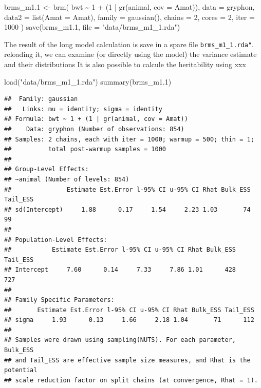 \documentclass[
  12pt,
]{book}
\newenvironment{Shaded}{\begin{snugshade}}{\end{snugshade}}
\newcommand{\AttributeTok}[1]{\textcolor[rgb]{0.77,0.63,0.00}{#1}}
\newcommand{\DecValTok}[1]{\textcolor[rgb]{0.00,0.00,0.81}{#1}}
\newcommand{\FloatTok}[1]{\textcolor[rgb]{0.00,0.00,0.81}{#1}}
\newcommand{\FunctionTok}[1]{\textcolor[rgb]{0.00,0.00,0.00}{#1}}
\newcommand{\NormalTok}[1]{#1}
\newcommand{\OtherTok}[1]{\textcolor[rgb]{0.56,0.35,0.01}{#1}}
\newcommand{\SpecialCharTok}[1]{\textcolor[rgb]{0.00,0.00,0.00}{#1}}
\newcommand{\StringTok}[1]{\textcolor[rgb]{0.31,0.60,0.02}{#1}}
\begin{document}
\begin{Shaded}
\begin{Highlighting}[]
\NormalTok{brms\_m1}\FloatTok{.1} \OtherTok{\textless{}{-}} \FunctionTok{brm}\NormalTok{(}
\NormalTok{  bwt }\SpecialCharTok{\textasciitilde{}} \DecValTok{1} \SpecialCharTok{+}\NormalTok{ (}\DecValTok{1} \SpecialCharTok{|} \FunctionTok{gr}\NormalTok{(animal, }\AttributeTok{cov =}\NormalTok{ Amat)),}
  \AttributeTok{data =}\NormalTok{ gryphon,}
  \AttributeTok{data2 =} \FunctionTok{list}\NormalTok{(}\AttributeTok{Amat =}\NormalTok{ Amat),}
  \AttributeTok{family =} \FunctionTok{gaussian}\NormalTok{(),}
  \AttributeTok{chains =} \DecValTok{2}\NormalTok{, }\AttributeTok{cores =} \DecValTok{2}\NormalTok{, }\AttributeTok{iter =} \DecValTok{1000}
\NormalTok{)}
\FunctionTok{save}\NormalTok{(brms\_m1}\FloatTok{.1}\NormalTok{, }\AttributeTok{file =} \StringTok{"data/brms\_m1\_1.rda"}\NormalTok{)}
\end{Highlighting}
\end{Shaded}

The result of the long model calculation is save in a spare file \texttt{brms\_m1\_1.rda"}.
reloading it, we can examine (or directly using the model) the variance estimate and their distributions
It is also possible to calcule the heritability using xxx

\begin{Shaded}
\begin{Highlighting}[]
\FunctionTok{load}\NormalTok{(}\StringTok{"data/brms\_m1\_1.rda"}\NormalTok{)}
\FunctionTok{summary}\NormalTok{(brms\_m1}\FloatTok{.1}\NormalTok{)}
\end{Highlighting}
\end{Shaded}

\begin{verbatim}
##  Family: gaussian 
##   Links: mu = identity; sigma = identity 
## Formula: bwt ~ 1 + (1 | gr(animal, cov = Amat)) 
##    Data: gryphon (Number of observations: 854) 
## Samples: 2 chains, each with iter = 1000; warmup = 500; thin = 1;
##          total post-warmup samples = 1000
## 
## Group-Level Effects: 
## ~animal (Number of levels: 854) 
##               Estimate Est.Error l-95% CI u-95% CI Rhat Bulk_ESS Tail_ESS
## sd(Intercept)     1.88      0.17     1.54     2.23 1.03       74       99
## 
## Population-Level Effects: 
##           Estimate Est.Error l-95% CI u-95% CI Rhat Bulk_ESS Tail_ESS
## Intercept     7.60      0.14     7.33     7.86 1.01      428      727
## 
## Family Specific Parameters: 
##       Estimate Est.Error l-95% CI u-95% CI Rhat Bulk_ESS Tail_ESS
## sigma     1.93      0.13     1.66     2.18 1.04       71      112
## 
## Samples were drawn using sampling(NUTS). For each parameter, Bulk_ESS
## and Tail_ESS are effective sample size measures, and Rhat is the potential
## scale reduction factor on split chains (at convergence, Rhat = 1).
\end{verbatim}
\end{document}
